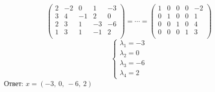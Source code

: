 \documentclass{article}
\begin{document}
\begin{center}
$$  $$ $$\left(\begin{array}{cccc|c}
        2 & -2 & 0  & 1  & -3 \\
        3 & 4  & -1 & 2  & 0  \\
        2 & 3  & 1  & -3 & -6 \\
        1 & 3  & 1  & -1 & 2  \\
      \end{array}\right)= \dotsb =\left(\begin{array}{cccc|c}
        1 & 0 & 0 & 0 & -2 \\
        0 & 1 & 0 & 0 & 1  \\
        0 & 0 & 1 & 0 & 4  \\
        0 & 0 & 0 & 1 & 3  \\
      \end{array}\right)
  $$$$\left\{\begin{array}{l}
      \lambda_1 =-3 \\
      \lambda_2 =0  \\
      \lambda_3 =-6 \\
      \lambda_4 =2
    \end{array}\right.$$
  Ответ: $x=(-3,\ 0,\ -6,\ 2)$
\end{center}
\end{document}
